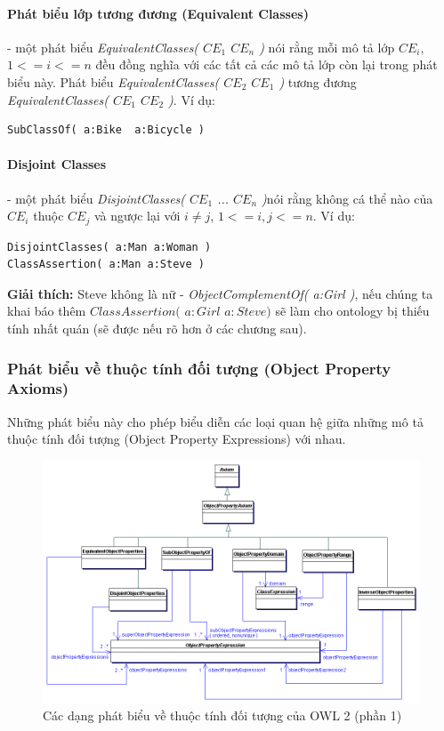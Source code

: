\paragraph{Phát biểu lớp tương đương (Equivalent Classes)} - một phát biểu \textit{EquivalentClasses( $CE_{1}$ $CE_{n}$ )} nói rằng mỗi mô tả lớp $CE_{i}$, $1<=i<=n$ đều đồng nghĩa với các tất cả các mô tả lớp còn lại trong phát biểu này. Phát biểu \textit{EquivalentClasses( $CE_{2}$ $CE_{1}$ )} tương đương \textit{EquivalentClasses( $CE_{1}$ $CE_{2}$ )}. Ví dụ:
\begin{verbatim}
SubClassOf( a:Bike  a:Bicycle )
\end{verbatim}

\paragraph{Disjoint Classes} - một phát biểu \textit{DisjointClasses( $CE_{1}$ ... $CE_{n}$ )}nói rằng không cá thể nào của $CE_{i}$ thuộc $CE_{j}$ và ngược lại với $i \neq j$, $1<=i,j<=n$. Ví dụ:
\begin{verbatim}
DisjointClasses( a:Man a:Woman )	
ClassAssertion( a:Man a:Steve )
\end{verbatim}
\textbf{Giải thích:} Steve không là nữ - \textit{ObjectComplementOf( a:Girl )}, nếu chúng ta khai báo thêm $ClassAssertion($ $a:Girl$ $a:Steve)$ sẽ làm cho ontology bị thiếu tính nhất quán (sẽ được nếu rõ hơn ở các chương sau).

\subsubsection{Phát biểu về thuộc tính đối tượng (Object Property Axioms)}
Những phát biểu này cho phép biểu diễn các loại quan hệ giữa những mô tả thuộc tính đối tượng (Object Property Expressions) với nhau.
\begin{figure}[h]
	\centering
	\includegraphics[width=160mm]{Figures/objectpropertyAxiom.png}
	\caption{Các dạng phát biểu về thuộc tính đối tượng của OWL 2 (phần 1)\label{overflow}}
\end{figure}

